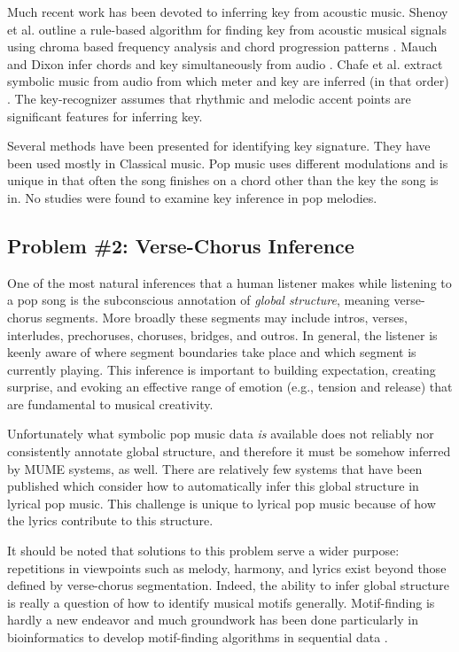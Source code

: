 \documentclass[letterpaper]{article}
\begin{document}
Much recent work has been devoted to inferring key from acoustic music. Shenoy et al. outline a rule-based algorithm for finding key from acoustic musical signals using chroma based frequency analysis and chord progression patterns \cite{shenoy2004key}. Mauch and Dixon infer chords and key simultaneously from audio \cite{mauch2010simultaneous}. Chafe et al. extract symbolic music from audio from which meter and key are inferred (in that order) \cite{chafe1982toward}. The key-recognizer assumes that rhythmic and melodic accent points are significant features for inferring key.

Several methods have been presented for identifying key signature. They have been used mostly in Classical music. Pop music uses different modulations and is unique in that often the song finishes on a chord other than the key the song is in. No studies were found to examine key inference in pop melodies.


\subsection{Problem \#2: Verse-Chorus Inference}

One of the most natural inferences that a human listener makes while listening to a pop song is the subconscious annotation of \emph{global structure}, meaning verse-chorus segments. More broadly these segments may include intros, verses, interludes, prechoruses, choruses, bridges, and outros. In general, the listener is keenly aware of where segment boundaries take place and which segment is currently playing. This inference is important to building expectation, creating surprise, and evoking an effective range of emotion (e.g., tension and release) that are fundamental to musical creativity.

Unfortunately what symbolic pop music data \emph{is} available does not reliably nor consistently annotate global structure, and therefore it must be somehow inferred by MUME systems, as well. There are relatively few systems that have been published which consider how to automatically infer this global structure in lyrical pop music. This challenge is unique to lyrical pop music because of how the lyrics contribute to this structure.

It should be noted that solutions to this problem serve a wider purpose: repetitions in viewpoints such as melody, harmony, and lyrics exist beyond those defined by verse-chorus segmentation. Indeed, the ability to infer global structure is really a question of how to identify musical motifs generally. Motif-finding is hardly a new endeavor and much groundwork has been done particularly in bioinformatics to develop motif-finding algorithms in sequential data \cite{NW, SW}.
\end{document}
